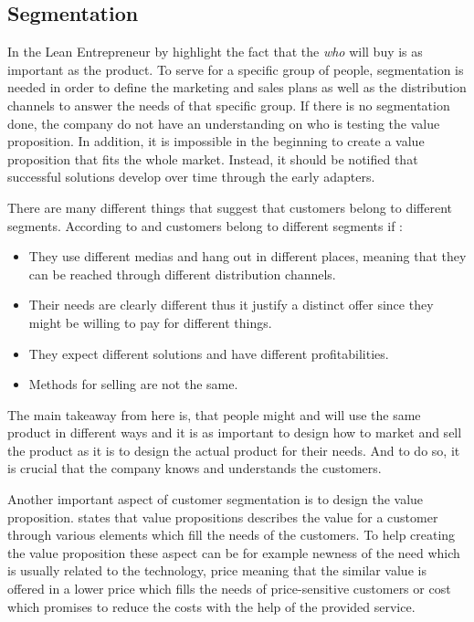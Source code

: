 \subsection{Segmentation}

In the Lean Entrepreneur by \textcite{LeanEntrepreneur:2013} highlight the fact that the \emph{who} will buy is as important as the product. To serve for a specific group of people, segmentation is needed in order to define the marketing and sales plans as well as the distribution channels to answer the needs of that specific group. If there is no segmentation done, the company do not have an understanding on who is testing the value proposition. In addition, it is impossible in the beginning to create a value proposition that fits the whole market. Instead, it should be notified that successful solutions develop over time through the early adapters.

There are many different things that suggest that customers belong to different segments. According to \textcite{LeanEntrepreneur:2013} and \textcite{BusinessModelGeneration:2010} customers belong to different segments if :
\begin{itemize}
\item They use different medias and hang out in different places, meaning that they can be reached through different distribution channels.
\item Their needs are clearly different thus it justify a distinct offer since they might be willing to pay for different things.
\item They expect different solutions and have different profitabilities.
\item Methods for selling are not the same.
\end{itemize}
The main takeaway from here is, that people might and will use the same product in different ways and it is as important to design how to market and sell the product as it is to design the actual product for their needs. And to do so, it is crucial that the company knows and understands the customers.

Another important aspect of customer segmentation is to design the value proposition. \textcite{BusinessModelGeneration:2010} states that value propositions describes the value for a customer through various elements which fill the needs of the customers. To help creating the value proposition these aspect can be for example newness of the need which is usually related to the technology, price meaning that the similar value is offered in a lower price which fills the needs of price-sensitive customers or cost which promises to reduce the costs with the help of the provided service.


